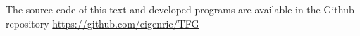 \newpage
\vspace*{\fill}
\doclicenseThis
The source code of this text and developed programs are available in the Github repository \href{https://github.com/eigenric/TFG}{https://github.com/eigenric/TFG}
